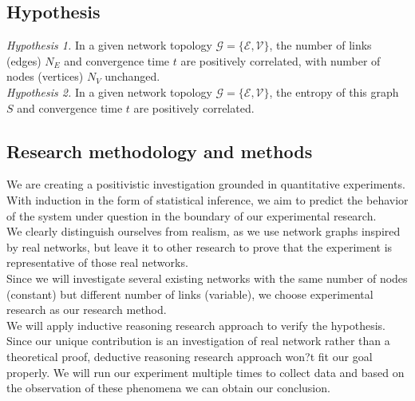 \subsection{Hypothesis}
{\it Hypothesis 1.} In a given network topology $\mathcal{G}=\{\mathcal{E}, \mathcal{V}\}$, the number of links (edges) $N_E$ and convergence time $t$ are positively correlated, with number of nodes (vertices) $N_V$ unchanged.\\
{\it Hypothesis 2.} In a given network topology $\mathcal{G}=\{\mathcal{E}, \mathcal{V}\}$, the entropy of this graph $S$ and convergence time $t$ are positively correlated.

\subsection{Research methodology and methods}
We are creating a positivistic investigation grounded in quantitative experiments. With induction in the form of statistical inference, we aim to predict the behavior of the system under question in the boundary of our experimental research.\\
We clearly distinguish ourselves from realism, as we use network graphs inspired by real networks, but leave it to other research to prove that the experiment is representative of those real networks.\\
Since we will investigate several existing networks with the same number of nodes (constant) but different number of links (variable), we choose experimental research as our research method.\\
We will apply inductive reasoning research approach to verify the hypothesis. Since our unique contribution is an investigation of real network rather than a theoretical proof, deductive reasoning research approach won?t fit our goal properly. We will run our experiment multiple times to collect data and based on the observation of these phenomena we can obtain our conclusion.\\
